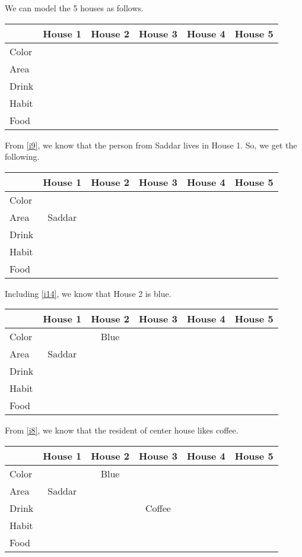 \documentclass[a4paper]{exam}
\newcommand\cb{\color{blue}}
\begin{document}
\begin{questions}
  \begin{solution}
    We can model the 5 houses as follows.
    
    \begin{tabular}{l||*5{c|}}
      & \textbf{House 1} & \textbf{House 2} & \textbf{House 3} & \textbf{House 4} & \textbf{House 5} \\
      \hline\hline
      Color & & &  &  & \\\hline
      Area &  &   & & & \\\hline
      Drink & & &  &  & \\\hline
      Habit & & & & & \\\hline
      Food & &  & & & \\\hline
    \end{tabular}

    From \ref{i9}, we know that the person from Saddar lives in House 1. So, we get the following.\\
    \begin{tabular}{l||*5{c|}}
      & \textbf{House 1} & \textbf{House 2} & \textbf{House 3} & \textbf{House 4} & \textbf{House 5} \\
      \hline\hline
      Color & & & & & \\\hline
      Area & Saddar & & & & \\\hline
      Drink & & & & & \\\hline
      Habit & & & & & \\\hline
      Food & & & & & \\\hline
    \end{tabular}

    Including \ref{i14}, we know that House 2 is blue.\\
    \begin{tabular}{l||*5{c|}}
      & \textbf{House 1} & \textbf{\cb House 2} & \textbf{House 3} & \textbf{House 4} & \textbf{House 5} \\
      \hline\hline
      Color & & Blue & & & \\\hline
      Area & Saddar & & & & \\\hline
      Drink & & & & & \\\hline
      Habit & & & & & \\\hline
      Food & & & & & \\\hline
    \end{tabular}

     From \ref{i8}, we know that the resident of center house likes coffee.\\
    \begin{tabular}{l||*5{c|}}
      & \textbf{House 1} & \textbf{\cb House 2} & \textbf{House 3} & \textbf{House 4} & \textbf{House 5} \\
      \hline\hline
      Color & & Blue & & & \\\hline
      Area & Saddar & & & & \\\hline
      Drink & & &Coffee & & \\\hline
      Habit & & & & & \\\hline
      Food & & & & & \\\hline
    \end{tabular}
    

\end{solution}
\end{questions}
\end{document}
